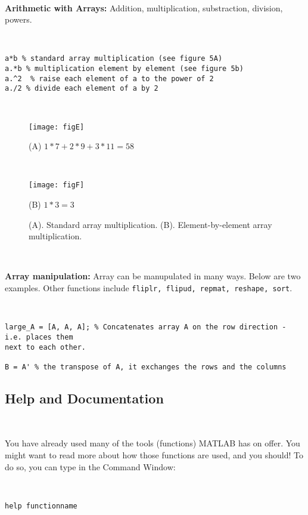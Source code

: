 \documentclass[11pt]{amsart}
\begin{document}
\


{\bf Arithmetic with Arrays:} Addition, multiplication, substraction, division, powers.

\

\color{blue}
\begin{verbatim}
a*b % standard array multiplication (see figure 5A)
a.*b % multiplication element by element (see figure 5b)
a.^2  % raise each element of a to the power of 2
a./2 % divide each element of a by 2
\end{verbatim}
\color{black}

\

\begin{figure}[h]
\centering
\caption{(A). Standard array multiplication. (B). Element-by-element array multiplication.}
\label{figE}
	 \texttt{[image: figE]}
	 
	 (A) $1*7 + 2*9 + 3*11 = 58$
	
	\
	
	 \texttt{[image: figF]}	 
	 
	 (B) $1*3 = 3$
\end{figure}

\

{\bf Array manipulation:} Array can be manupulated in many ways. Below are two examples. Other functions include \verb+fliplr, flipud, repmat, reshape, sort+.

\

\color{blue}
\begin{verbatim}
large_A = [A, A, A]; % Concatenates array A on the row direction - i.e. places them 
next to each other.

B = A' % the transpose of A, it exchanges the rows and the columns
\end{verbatim}
\color{black}



\subsection{Help and Documentation}

\

You have already used many of the tools (functions) MATLAB has on offer. You might want to read more about how those functions are used, and you should! To do so, you can type in the Command Window:

\

\color{blue}
\begin{verbatim}
help functionname
\end{verbatim}
\color{black}
\end{document}

